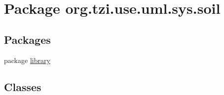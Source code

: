 \hypertarget{namespaceorg_1_1tzi_1_1use_1_1uml_1_1sys_1_1soil}{\section{Package org.\-tzi.\-use.\-uml.\-sys.\-soil}
\label{namespaceorg_1_1tzi_1_1use_1_1uml_1_1sys_1_1soil}
}
\subsection*{Packages}
\begin{DoxyCompactItemize}
\item 
package \hyperlink{namespaceorg_1_1tzi_1_1use_1_1uml_1_1sys_1_1soil_1_1library}{library}
\end{DoxyCompactItemize}
\subsection*{Classes}
